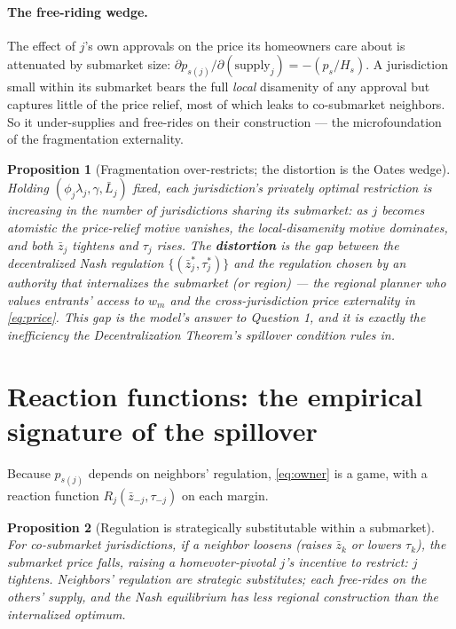 \documentclass[11pt]{article}
\newtheorem{proposition}{Proposition}
\begin{document}
\paragraph{The free-riding wedge.} The effect of $j$'s own approvals on the price its homeowners
care about is attenuated by submarket size: $\partial p_{s(j)}/\partial(\text{supply}_j)
=-(p_s/H_s)$. A jurisdiction small within its submarket bears the full \emph{local} disamenity of
any approval but captures little of the price relief, most of which leaks to co-submarket
neighbors. So it under-supplies and free-rides on their construction --- the microfoundation of
the fragmentation externality.

\begin{proposition}[Fragmentation over-restricts; the distortion is the Oates wedge]\label{prop:wedge}
Holding $(\phi_j\lambda_j,\gamma,\bar L_j)$ fixed, each jurisdiction's privately optimal
restriction is increasing in the number of jurisdictions sharing its submarket: as $j$ becomes
atomistic the price-relief motive vanishes, the local-disamenity motive dominates, and both
$\bar z_j$ tightens and $\tau_j$ rises. The \textbf{distortion} is the gap between the
decentralized Nash regulation $\{(\bar z_j^\ast,\tau_j^\ast)\}$ and the regulation chosen by an
authority that internalizes the submarket (or region) --- the regional planner who values
entrants' access to $w_m$ and the cross-jurisdiction price externality in \eqref{eq:price}. This
gap is the model's answer to Question 1, and it is exactly the inefficiency the Decentralization
Theorem's spillover condition rules in.
\end{proposition}

\section{Reaction functions: the empirical signature of the spillover}\label{sec:react}

Because $p_{s(j)}$ depends on neighbors' regulation, \eqref{eq:owner} is a game, with a reaction
function $R_j(\bar z_{-j},\tau_{-j})$ on each margin.

\begin{proposition}[Regulation is strategically substitutable within a submarket]\label{prop:react}
For co-submarket jurisdictions, if a neighbor loosens (raises $\bar z_k$ or lowers $\tau_k$), the
submarket price falls, raising a homevoter-pivotal $j$'s incentive to restrict: $j$ tightens.
Neighbors' regulation are strategic substitutes; each free-rides on the others' supply, and the
Nash equilibrium has less regional construction than the internalized optimum.
\end{proposition}
\end{document}
